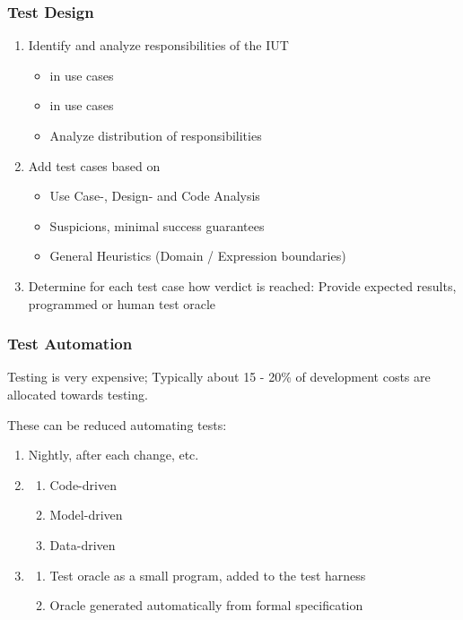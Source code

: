\documentclass[
    ../../Software_Engineering_Summary.tex,
]
{subfiles}
\begin{document}
\subsubsection{Test Design}
\begin{defbox*}
    \begin{enumerate}
        \item Identify and analyze responsibilities of the IUT
        \begin{itemize}
            \item {} in use cases
            \item {} in use cases
            \item Analyze distribution of responsibilities
        \end{itemize}
        \item Add test cases based on
        \begin{itemize}
            \item Use Case-, Design- and Code Analysis
            \item Suspicions, minimal success guarantees
            \item General Heuristics (Domain / Expression boundaries)
        \end{itemize}
        \item Determine for each test case how verdict is reached: Provide expected results, programmed or human test oracle
    \end{enumerate}
\end{defbox*}

\subsubsection{Test Automation}
Testing is very expensive; Typically about 15 - 20\% of development costs are allocated towards testing.

These can be reduced automating tests:
\begin{enumerate}
    \item {} Nightly, after each change, etc.
    \item {} 
    \begin{enumerate}
        \item Code-driven
        \item Model-driven
        \item Data-driven
    \end{enumerate}
    \item {}
    \begin{enumerate}
        \item Test oracle as a small program, added to the test harness
        \item Oracle generated automatically from formal specification
    \end{enumerate}
\end{enumerate}
\end{document}
